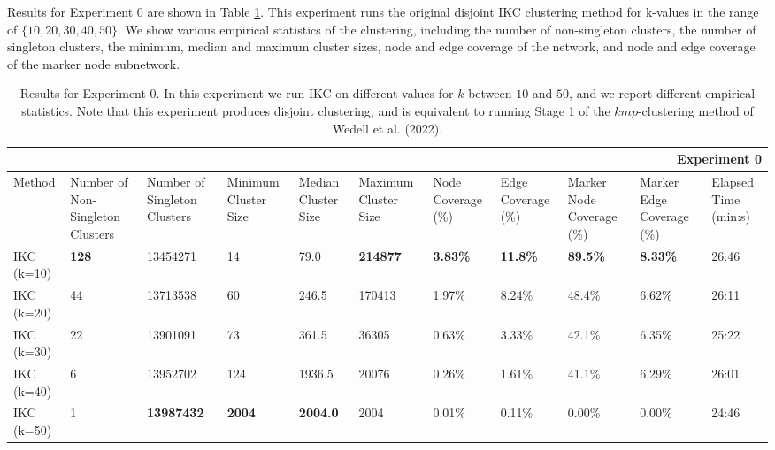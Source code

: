 \documentclass{article}
\begin{document}
Results for Experiment 0 are shown in Table \ref{table:expt0}. This experiment runs the original disjoint IKC clustering method for k-values in the range of $\{10, 20, 30, 40, 50\}$. We show various empirical statistics of the clustering,  including the number of non-singleton clusters, the number of singleton clusters, the minimum, median and maximum cluster sizes,  node and edge coverage of the network, and node and edge coverage of the marker node subnetwork.

\begin{table}[h!]
\centering
\begin{small}
	\begin{tabular}{ |p{0.95cm}||p{1.25cm}|p{1.25cm}||p{1.20cm}|p{1.20cm}|p{1.20cm}||p{1.25cm}|p{1.25cm}|| p{1.25cm}|p{1.25cm}||p{0.95cm}| }
		\hline
		\multicolumn{11}{|r|}{Experiment 0} \\
		\hline
		Method & Number of Non-Singleton Clusters & Number of Singleton Clusters & Minimum Cluster Size &  Median Cluster Size & Maximum Cluster Size & Node Coverage (\%)& Edge Coverage  (\%)& Marker Node Coverage  (\%)& Marker Edge Coverage  (\%) & Elapsed Time (min:s) \\
		\hline
		IKC (k=10)   &  \textbf{128}    & 13454271 &   14 & 79.0 & \textbf{214877} & \textbf{3.83\%} & \textbf{11.8\% }& \textbf{89.5\% }& \textbf{8.33\% }& 26:46\\ \hline
		IKC (k=20)   &  44    & 13713538 &   60 & 246.5 & 170413 & 1.97\% & 8.24\% & 48.4\% & 6.62\% & 26:11\\ \hline
		IKC (k=30)   &  22    & 13901091 &   73 & 361.5 & 36305 & 0.63\% & 3.33\% & 42.1\% & 6.35\% & 25:22\\ \hline
		IKC (k=40)   &  6    & 13952702 &   124 & 1936.5 & 20076 & 0.26\% & 1.61\% & 41.1\% & 6.29\% & 26:01\\ \hline
		IKC (k=50)   &  1    & \textbf{13987432} &   \textbf{2004} & \textbf{2004.0} & 2004 & 0.01\% & 0.11\% & 0.00\% & 0.00\% & 24:46\\ \hline
		\hline
	\end{tabular}
	\end{small}
	\caption{Results for Experiment 0. In this experiment we run IKC on different values for $k$ between $10$ and $50$, and we report different
	empirical statistics. Note that this experiment produces disjoint clustering, and is equivalent to running Stage 1 of the $kmp$-clustering method of Wedell et al. (2022).}
		\label{table:expt0}
\end{table}
\end{document}
